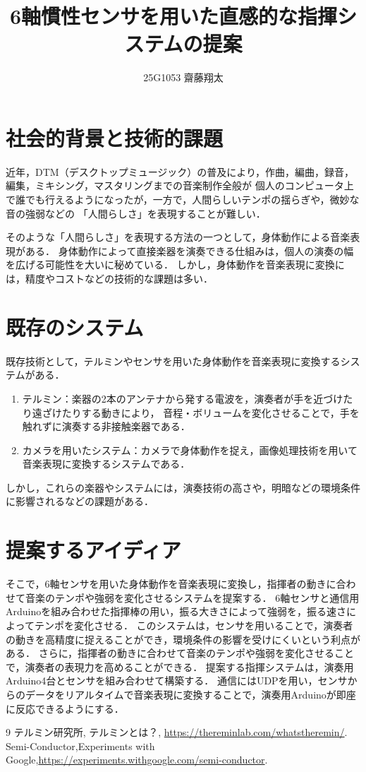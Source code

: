 \documentclass[uplatex,dvipdfmx]{jlreq}
\begin{document}
\title{6軸慣性センサを用いた直感的な指揮システムの提案}
\author{25G1053 齋藤翔太}
\maketitle
\section{社会的背景と技術的課題}
近年，DTM（デスクトップミュージック）の普及により，作曲，編曲，録音，編集，ミキシング，マスタリングまでの音楽制作全般が
個人のコンピュータ上で誰でも行えるようになったが，一方で，人間らしいテンポの揺らぎや，微妙な音の強弱などの
「人間らしさ」を表現することが難しい．

そのような「人間らしさ」を表現する方法の一つとして，身体動作による音楽表現がある．
身体動作によって直接楽器を演奏できる仕組みは，個人の演奏の幅を広げる可能性を大いに秘めている．
しかし，身体動作を音楽表現に変換には，精度やコストなどの技術的な課題は多い．

\section{既存のシステム}
既存技術として，テルミンやセンサを用いた身体動作を音楽表現に変換するシステムがある．

\begin{enumerate}
  \item テルミン：楽器の2本のアンテナから発する電波を，演奏者が手を近づけたり遠ざけたりする動きにより，
音程・ボリュームを変化させることで，手を触れずに演奏する非接触楽器である\cite{ref:テルミン}．
  \item カメラを用いたシステム：カメラで身体動作を捉え，画像処理技術を用いて音楽表現に変換するシステムである\cite{ref:画像認識}．
\end{enumerate}
しかし，これらの楽器やシステムには，演奏技術の高さや，明暗などの環境条件に影響されるなどの課題がある．

\section{提案するアイディア}
そこで，6軸センサを用いた身体動作を音楽表現に変換し，指揮者の動きに合わせて音楽のテンポや強弱を変化させるシステムを提案する．
6軸センサと通信用Arduinoを組み合わせた指揮棒の用い，振る大きさによって強弱を，振る速さによってテンポを変化させる．
このシステムは，センサを用いることで，演奏者の動きを高精度に捉えることができ，環境条件の影響を受けにくいという利点がある．
さらに，指揮者の動きに合わせて音楽のテンポや強弱を変化させることで，演奏者の表現力を高めることができる．
提案する指揮システムは，演奏用Arduino4台とセンサを組み合わせて構築する．
通信にはUDPを用い，センサからのデータをリアルタイムで音楽表現に変換することで，演奏用Arduinoが即座に反応できるようにする．


\begin{thebibliography}{9}
 テルミン研究所, テルミンとは？, \url{https://thereminlab.com/whatstheremin/}.
 Semi-Conductor,Experiments with Google,\url{https://experiments.withgoogle.com/semi-conductor}.
\end{thebibliography}
\end{document}
